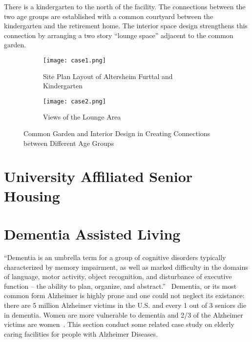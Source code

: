 There is a kindergarten to the north of the facility. The connections
between the two age groups are established with a common courtyard
between the kindergarten and the retirement home. The interior space
design strengthens this connection by arranging a two story ``lounge
space'' adjacent to the common garden.

\begin{figure}
\centering
\begin{subfigure}{0.7\textwidth}
  \centering
  \texttt{[image: case1.png]}
  \caption{Site Plan Layout of Altersheim Furttal and Kindergarten}
  \label{fig:case1}
\end{subfigure}
\begin{subfigure}{0.7\textwidth}
  \centering
  \texttt{[image: case2.png]}
  \caption{Views of the Lounge Area}
  \label{fig:case2}
\end{subfigure}
\caption{Common Garden and Interior Design in Creating Connections
  between Different Age Groups}
\label{fig:case2}
\end{figure}
\section{University Affiliated Senior Housing}
\section{Dementia Assisted Living}
``Dementia is an umbrella term for a group of cognitive disorders
typically characterized by memory impairment, as well as marked
difficulty in the domains of language, motor activity, object
recognition, and disturbance of executive function – the ability to
plan, organize, and abstract.''~\cite{CDCdementia} Dementia, or its
most common form Alzheimer is highly prone and one could not neglect
its existance: there are 5 million Alzheimer victims in the U.S. and
every 1 out of 3 seniors die in dementia. Women are more vulnerable to
dementia and 2/3 of the Alzheimer victims are
women~\cite{alzorg2014}. This section conduct some related case study
on elderly caring facilities for people with Alzheimer Diseases. 

